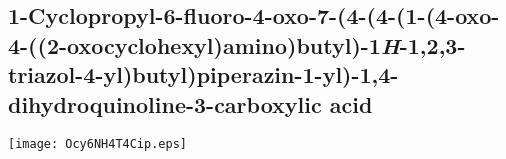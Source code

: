 {\subsection{1\hyp{}Cyclopropyl\hyp{}6\hyp{}fluoro\hyp{}4\hyp{}oxo\hyp{}7\hyp{}(4\hyp{}(4\hyp{}(1\hyp{}(4\hyp{}oxo\hyp{}4\hyp{}((2\hyp{}oxocyclohexyl)amino)bu\allowbreak t\allowbreak yl)\hyp{}1\textit{H}\hyp{}1,2,3\hyp{}triazol\hyp{}4\hyp{}yl)butyl)piperazin\hyp{}1\hyp{}yl)\hyp{}1,4\hyp{}dihydroquinoline\hyp{}3\hyp{}carb\allowbreak o\allowbreak x\allowbreak ylic acid }


\begin{scheme}[H]
	\begin{center}
		\texttt{[image: Ocy6NH4T4Cip.eps]}
	\end{center}
\end{scheme}

}

